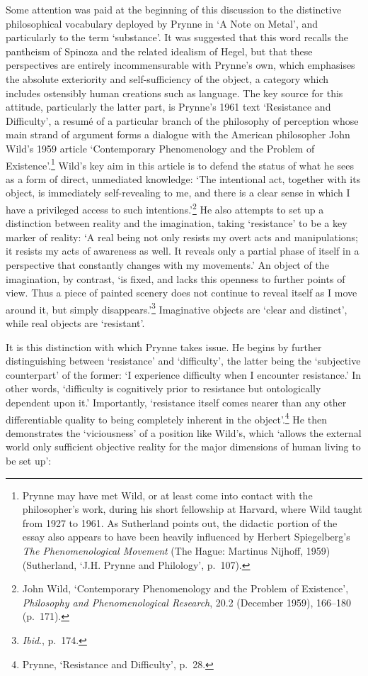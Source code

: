 \documentclass[]{article}
\begin{document}
Some attention was paid at the beginning of this discussion to the
distinctive philosophical vocabulary deployed by Prynne in `A Note on
Metal', and particularly to the term `substance'. It was suggested that
this word recalls the pantheism of Spinoza and the related idealism of
Hegel, but that these perspectives are entirely incommensurable with
Prynne's own, which emphasises the absolute exteriority and
self-sufficiency of the object, a category which includes ostensibly
human creations such as language. The key source for this attitude,
particularly the latter part, is Prynne's 1961 text `Resistance and
Difficulty', a resumé of a particular branch of the philosophy of
perception whose main strand of argument forms a dialogue with the
American philosopher John Wild's 1959 article `Contemporary
Phenomenology and the Problem of Existence'.\footnote{Prynne may have
  met Wild, or at least come into contact with the philosopher's work,
  during his short fellowship at Harvard, where Wild taught from 1927 to
  1961. As Sutherland points out, the didactic portion of the essay also
  appears to have been heavily influenced by Herbert Spiegelberg's
  \emph{The Phenomenological Movement} (The Hague: Martinus Nijhoff,
  1959) (Sutherland, `J.H. Prynne and Philology', p.~107).} Wild's key
aim in this article is to defend the status of what he sees as a form of
direct, unmediated knowledge: `The intentional act, together with its
object, is immediately self-revealing to me, and there is a clear sense
in which I have a privileged access to such intentions.'\footnote{John
  Wild, `Contemporary Phenomenology and the Problem of Existence',
  \emph{Philosophy and Phenomenological Research}, 20.2 (December 1959),
  166--180 (p.~171).} He also attempts to set up a distinction between
reality and the imagination, taking `resistance' to be a key marker of
reality: `A real being not only resists my overt acts and manipulations;
it resists my acts of awareness as well. It reveals only a partial phase
of itself in a perspective that constantly changes with my movements.'
An object of the imagination, by contrast, `is fixed, and lacks this
openness to further points of view. Thus a piece of painted scenery does
not continue to reveal itself as I move around it, but simply
disappears.'\footnote{\emph{Ibid}., p.~174.} Imaginative objects are
`clear and distinct', while real objects are `resistant'.

It is this distinction with which Prynne takes issue. He begins by
further distinguishing between `resistance' and `difficulty', the latter
being the `subjective counterpart' of the former: `I experience
difficulty when I encounter resistance.' In other words, `difficulty is
cognitively prior to resistance but ontologically dependent upon it.'
Importantly, `resistance itself comes nearer than any other
differentiable quality to being completely inherent in the
object'.\footnote{Prynne, `Resistance and Difficulty', p.~28.} He then
demonstrates the `viciousness' of a position like Wild's, which `allows
the external world only sufficient objective reality for the major
dimensions of human living to be set up':
\end{document}
